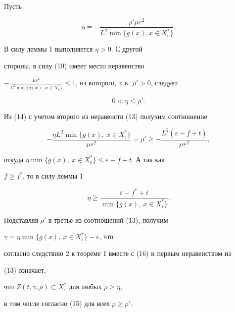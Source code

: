 \begin{pf}


Пусть


\begin{equation}


\eta=-\frac{\rho'\mu\varepsilon^2}{L^2\min\{g(x), x\in


X_{\varepsilon}^*\}}.


\end{equation}


В силу леммы 1 выполняется $\eta>0$. С другой


стороны, в силу (10) имеет место неравенство


$-\frac{\mu\varepsilon^2}{L^2\min\{g(x),


\ x\in X_{\varepsilon}^*\}}\le 1$, из которого, т.\,к. $\rho'>0$, следует


\begin{equation}


0<\eta\le\rho'.


\end{equation}


Из (14) с учетом второго из неравенств (13) получим соотношение


$$


-\frac{\eta L^2\min\{g(x),\ x\in


X_{\varepsilon}^*\}}{\mu\varepsilon^2}=\rho'\ge-\frac{L^2(\varepsilon-


\overline{f}+t)}{\mu\varepsilon^2},


$$


откуда $\eta\min\{g(x),\ x\in


X_{\varepsilon}^*\}\le \varepsilon-\overline{f}+t$. А так как


$\overline{f}\ge f^*$, то в силу леммы 1


\begin{equation}


\eta\ge\frac{\varepsilon-f^*+t}{\min\{g(x),\ x\in X_{\varepsilon}^*\}}.


\end{equation}


Подставляя $\rho'$ в третье из соотношений (13), получим


$\gamma=\eta\min\{g(x),\ x\in X_{\varepsilon}^*\}-\varepsilon$, что


согласно следствию 2 к теореме 1 вместе с (16) и первым неравенством из


(13) означает,


что $Z(t,\gamma,\rho)\subset X_{\varepsilon}^*$ для любых $\rho\ge\eta$,


в том числе согласно (15) для всех $\rho\ge\rho'$.


\end{pf}





